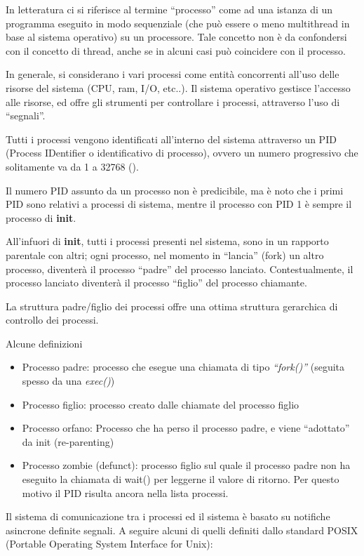 
In letteratura ci si riferisce al termine ``processo'' come ad una istanza di un programma eseguito in modo sequenziale (che può essere o meno multithread in base al sistema operativo) su un processore. Tale concetto non è da confondersi con il concetto di thread, anche se in alcuni casi può coincidere con il processo.

In generale, si considerano i vari processi come entità concorrenti all'uso delle risorse del sistema (CPU, ram, I/O, etc..). Il sistema operativo gestisce l'accesso alle risorse, ed offre gli strumenti per controllare i processi, attraverso l'uso di ``segnali''. 

Tutti i processi vengono identificati all'interno del sistema attraverso un PID (Process IDentifier o identificativo di processo), ovvero un numero progressivo che solitamente va da 1 a 32768 (). 

Il numero PID assunto da un processo non è predicibile, ma è noto che i primi PID sono relativi a processi di sistema, mentre il processo con PID 1 è sempre il processo di \textbf{init}.

All'infuori di \textbf{init}, tutti i processi presenti nel sistema, sono in un rapporto parentale con altri; ogni processo, nel momento in ``lancia'' (fork) un altro processo, diventerà il processo ``padre'' del processo lanciato. Contestualmente, il processo lanciato diventerà il processo ``figlio'' del processo chiamante.

La struttura padre/figlio dei processi offre una ottima struttura gerarchica di controllo dei processi. 

Alcune definizioni

\begin{itemize}
 \item Processo padre: processo che esegue una chiamata di tipo \textit{``fork()''} (seguita spesso da una \textit{exec()})
 \item Processo figlio: processo creato dalle chiamate del processo figlio
 \item Processo orfano: Processo che ha perso il processo padre, e viene ``adottato'' da init (re-parenting)
 \item Processo zombie (defunct): processo figlio sul quale il processo padre non ha eseguito la chiamata di wait() per leggerne il valore di ritorno. Per questo motivo il PID risulta ancora nella lista processi.  
\end{itemize}

Il sistema di comunicazione tra i processi ed il sistema è basato su notifiche asincrone definite segnali. A seguire alcuni di quelli definiti dallo standard POSIX (Portable Operating System Interface for Unix):

